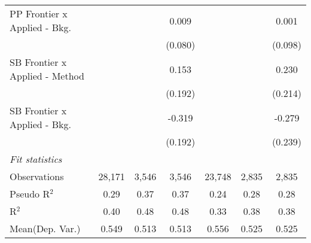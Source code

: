 \begin{tabular}{lcccccc}
   PP Frontier x Applied - Bkg.   &               &             & 0.009          &                &             & 0.001\\   
                                  &               &             & (0.080)        &                &             & (0.098)\\   
   SB Frontier x Applied - Method &               &             & 0.153          &                &             & 0.230\\   
                                  &               &             & (0.192)        &                &             & (0.214)\\   
   SB Frontier x Applied - Bkg.   &               &             & -0.319         &                &             & -0.279\\   
                                  &               &             & (0.192)        &                &             & (0.239)\\   
   \midrule
   \emph{Fit statistics}\\
   Observations                   & 28,171        & 3,546       & 3,546          & 23,748         & 2,835       & 2,835\\  
   Pseudo R$^2$                   & 0.29          & 0.37        & 0.37           & 0.24           & 0.28        & 0.28\\  
   R$^2$                          & 0.40          & 0.48        & 0.48           & 0.33           & 0.38        & 0.38\\  
Mean(Dep. Var.) & 0.549 & 0.513 & 0.513 & 0.556 & 0.525 & 0.525 \\
   

\end{tabular}
